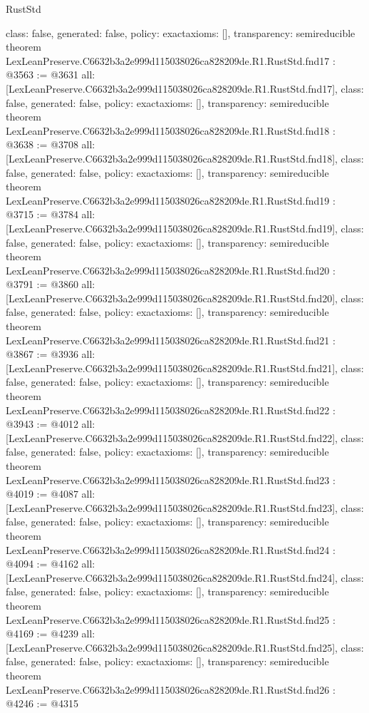 \begin{lexlean}{RustStd}
\begin{coremodule}
{  class: false,
  generated: false,
  policy: exact{axioms: []},
  transparency: semireducible
}
theorem LexLeanPreserve.C6632b3a2e999d115038026ca828209de.R1.RustStd.fnd17 : @3563 := @3631 {
  all: [LexLeanPreserve.C6632b3a2e999d115038026ca828209de.R1.RustStd.fnd17],
  class: false,
  generated: false,
  policy: exact{axioms: []},
  transparency: semireducible
}
theorem LexLeanPreserve.C6632b3a2e999d115038026ca828209de.R1.RustStd.fnd18 : @3638 := @3708 {
  all: [LexLeanPreserve.C6632b3a2e999d115038026ca828209de.R1.RustStd.fnd18],
  class: false,
  generated: false,
  policy: exact{axioms: []},
  transparency: semireducible
}
theorem LexLeanPreserve.C6632b3a2e999d115038026ca828209de.R1.RustStd.fnd19 : @3715 := @3784 {
  all: [LexLeanPreserve.C6632b3a2e999d115038026ca828209de.R1.RustStd.fnd19],
  class: false,
  generated: false,
  policy: exact{axioms: []},
  transparency: semireducible
}
theorem LexLeanPreserve.C6632b3a2e999d115038026ca828209de.R1.RustStd.fnd20 : @3791 := @3860 {
  all: [LexLeanPreserve.C6632b3a2e999d115038026ca828209de.R1.RustStd.fnd20],
  class: false,
  generated: false,
  policy: exact{axioms: []},
  transparency: semireducible
}
theorem LexLeanPreserve.C6632b3a2e999d115038026ca828209de.R1.RustStd.fnd21 : @3867 := @3936 {
  all: [LexLeanPreserve.C6632b3a2e999d115038026ca828209de.R1.RustStd.fnd21],
  class: false,
  generated: false,
  policy: exact{axioms: []},
  transparency: semireducible
}
theorem LexLeanPreserve.C6632b3a2e999d115038026ca828209de.R1.RustStd.fnd22 : @3943 := @4012 {
  all: [LexLeanPreserve.C6632b3a2e999d115038026ca828209de.R1.RustStd.fnd22],
  class: false,
  generated: false,
  policy: exact{axioms: []},
  transparency: semireducible
}
theorem LexLeanPreserve.C6632b3a2e999d115038026ca828209de.R1.RustStd.fnd23 : @4019 := @4087 {
  all: [LexLeanPreserve.C6632b3a2e999d115038026ca828209de.R1.RustStd.fnd23],
  class: false,
  generated: false,
  policy: exact{axioms: []},
  transparency: semireducible
}
theorem LexLeanPreserve.C6632b3a2e999d115038026ca828209de.R1.RustStd.fnd24 : @4094 := @4162 {
  all: [LexLeanPreserve.C6632b3a2e999d115038026ca828209de.R1.RustStd.fnd24],
  class: false,
  generated: false,
  policy: exact{axioms: []},
  transparency: semireducible
}
theorem LexLeanPreserve.C6632b3a2e999d115038026ca828209de.R1.RustStd.fnd25 : @4169 := @4239 {
  all: [LexLeanPreserve.C6632b3a2e999d115038026ca828209de.R1.RustStd.fnd25],
  class: false,
  generated: false,
  policy: exact{axioms: []},
  transparency: semireducible
}
theorem LexLeanPreserve.C6632b3a2e999d115038026ca828209de.R1.RustStd.fnd26 : @4246 := @4315 {
}
\end{coremodule}
\end{lexlean}
